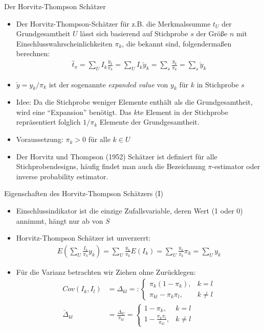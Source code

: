 \documentclass[9pt]{beamer}
\begin{document}
\begin{frame}{Der Horvitz-Thompson Schätzer}
\begin{itemize}
	\item Der Horvitz-Thompson-Schätzer für z.B. die Merkmalssumme $t_U$ der Grundgesamtheit $U$ lässt sich basierend auf Stichprobe $s$ der Größe $n$ mit  Einschlusswahrscheinlichkeiten $\pi_k$, die bekannt sind, folgendermaßen berechnen:
	\begin{align*}
	\hat{t}_\pi = \sum_{U} I_k \frac{y_k}{\pi_k} =\sum_{U} I_k \check{y}_k = \sum_{s} \frac{y_k}{\pi_k} = \sum_{s} \check{y}_k		
	\end{align*}
	\item $\check{y}=y_k/\pi_k$ ist der sogenannte \textit{expanded value} von $y_k$ für $k$ in Stichprobe $s$
	\item Idee: Da die Stichprobe weniger Elemente enthält als die Grundgesamtheit, wird eine \enquote{Expansion} benötigt. Das $k$te Element in der Stichprobe repräsentiert folglich $1/\pi_k$ Elemente der Grundgesamtheit.
	\item Voraussetzung: $\pi_k>0$ für alle $k\in U$
	\item Der Horvitz und Thompson (1952) Schätzer ist definiert für alle Stichprobendesigns, häufig findet man auch die Bezeichnung $\pi$-estimator oder inverse probability estimator.
\end{itemize}
\end{frame}

\begin{frame}{Eigenschaften des Horvitz-Thompson Schätzers (I)}
\begin{itemize}
	\item Einschlussindikator ist die einzige Zufallsvariable, deren Wert (1 oder 0) annimmt, hängt nur ab von $S$
	\item Horvitz-Thompson Schätzer ist unverzerrt:
	\begin{align*}
	E\left(\sum_U \frac{I_k}{\pi_k} y_k\right)=\sum_U \frac{y_k}{\pi_k} E(I_k) = \sum_U \frac{y_k}{\pi_k} \pi_k = \sum_U y_k
	\end{align*}
	\item Für die Varianz betrachten wir Ziehen ohne Zurücklegen:
	\begin{align*}
	Cov(I_k,I_l) &= \Delta_{kl} =: \begin{cases} \pi_k(1-\pi_k), & k=l\\\pi_{kl}-\pi_k\pi_l, & k\neq l\end{cases}\\
	\check{\Delta}_{kl} &= \frac{\Delta_{kl}}{\pi_{kl}} = \begin{cases}1-\pi_k, & k=l\\ 1-\frac{\pi_k \pi_l}{\pi_{kl}}, & k \neq l
	\end{cases}
	\end{align*}
\end{itemize}
\end{frame}
\end{document}
